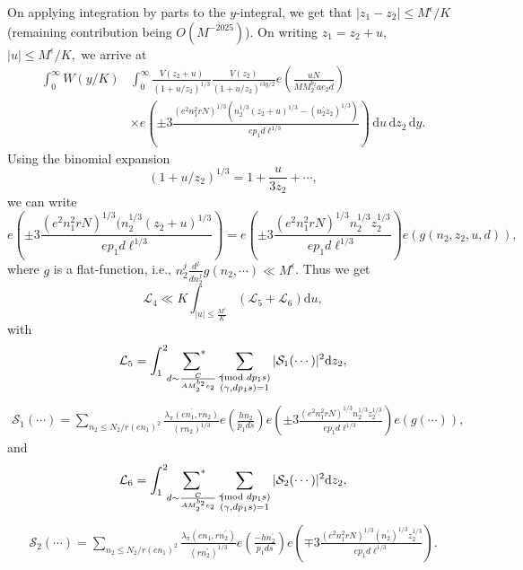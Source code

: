 \documentclass[12pt,a4paper,twoside, reqno]{amsart}
\newcommand{\shortmod}{\ensuremath{\negthickspace \negthickspace \negthickspace \pmod}}
\newcommand{\sumstar}{\sideset{}{^*}\sum}
\begin{document}
 On applying integration by parts to the $y$-integral, we get that  $|z_1-z_2| \leq M^\epsilon/K$ (remaining contribution being $O(M^{- 2025})$). On writing $z_1=z_2+u,$ $|u| \leq M^{\epsilon}/K,$ we arrive at 
\begin{align*}
   \int_{0}^{\infty} W(y/K) &\int_{0}^{\infty} \frac{V(z_2+u)}{ (1+u/z_2)^{1/3} } \frac{V(z_2)}{(1+u/z_2)^{i3y/2}}  e\left(\frac{ u N}{MM_2^{b_2}ae_2d} \right)   \\
  &\times  e\left(\pm 3 \frac{(e^2n_1^2r N)^{1/3}(n_2^{1/3}(z_2+u)^{1/3}-(n_2^\prime z_2)^{1/3}) }{  ep_1d \ell^{{1/3}}}\right)  \, \mathrm{d} u \, \mathrm{d} z_2  \,\mathrm{d} y.
\end{align*}
Using the binomial expansion 
\[ (1+u/z_2)^{1/3}=1+\frac{u}{3 z_2}+\cdots,  \]
we can write 
\[e\left(\pm 3 \frac{(e^2n_1^2r N)^{1/3}(n_2^{1/3}(z_2+u)^{1/3} }{  ep_1d \ell^{{1/3}}}\right) = e\left(\pm 3 \frac{(e^2n_1^2r N)^{1/3}n_2^{1/3}z_2^{1/3} }{  ep_1d \ell^{{1/3}}}\right)e(g(n_2,z_2,u,d)),  \]
 where $g$ is a flat-function, i.e., $n_2^j\frac{d^j}{dn_2^j}g(n_2,\cdots) \ll M^{\epsilon}$. 
Thus we get  
\[   \mathcal{L}_4 \ll K \int_{|u| \leq \frac{M^\epsilon}{K}}(\mathcal{L}_5 +\mathcal{L}_6  ) \mathrm{d}u,\]
with 
\begin{align}\label{l5}
     \mathcal{L}_5= \int_1^2\mathop{\sumstar_{ \substack{d \sim \frac{C}{A M_2^{b_2} e_2}
       } } }\sum_{\substack{ \gamma \shortmod{dp_1s} \\ (\gamma, dp_1s)=1 }   } | \mathcal{S}_1(\cdots)|^2 \mathrm{d}z_2,
\end{align}
\begin{align*}
        \mathcal{S}_1(\cdots)=\sum_{n_2 \leq  N_2/r(en_1)^2}  \frac{\overline{\lambda_\pi(en_1,rn_2)}}{ {(rn_2)^{1/3}}  }  e\left( \frac{hn_2}{p_1ds}\right) e\left(\pm 3 \frac{(e^2n_1^2r N)^{1/3}n_2^{1/3}z_2^{1/3} }{  ep_1d \ell^{{1/3}}}\right)e(g(\cdots)),
\end{align*}
and
\begin{align*}
     \mathcal{L}_6= \int_1^2\mathop{\sumstar_{ \substack{d \sim \frac{C}{A M_2^{b_2} e_2}
       } } }\sum_{\substack{ \gamma \shortmod{dp_1s} \\ (\gamma, dp_1s)=1 }   } | \mathcal{S}_2(\cdots)|^2 \mathrm{d}z_2,
\end{align*}
\begin{align*}
        \mathcal{S}_2(\cdots)=  \sum_{n_2 \leq  N_2/r(en_1)^2}  \frac{{\lambda_\pi(en_1,rn_2^\prime)}}{ {(rn_2^\prime)^{1/3}}  }  e\left( \frac{-hn_2^\prime}{p_1ds}\right)  e\left(\mp 3 \frac{(e^2n_1^2r N)^{1/3}(n_2^\prime)^{1/3}z_2^{1/3} }{  ep_1d \ell^{{1/3}}}\right).
\end{align*}
\end{document}
